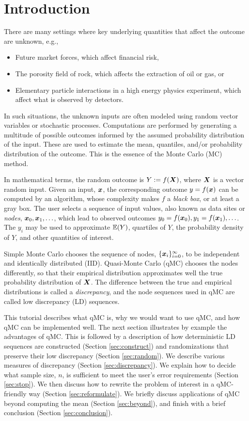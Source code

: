 \documentclass{svproc}
\newcounter{algorithm}%
\begin{document}
\section{Introduction} \label{sec:intro}
There are many settings where key underlying quantities that affect the outcome are unknown, e.g.,
\begin{itemize}
	\item Future market forces, which affect financial risk,
	\item The porosity field of rock, which affects the extraction of oil or gas, or
	\item Elementary particle interactions in a high energy physics experiment, which affect what is observed by detectors.
\end{itemize}
In such situations, the unknown inputs are often modeled using random vector variables or stochastic processes.  Computations are performed by generating a multitude of possible outcomes informed by the assumed probability distribution of the input. These are used to estimate the mean, quantiles, and/or probability distribution of the outcome.  This is the essence of the Monte Carlo (MC) method.

In mathematical terms, the random outcome is $Y := f({\boldsymbol{X}})$, where ${\boldsymbol{X}}$ is a vector random input.  Given an input, ${\boldsymbol{x}}$, the corresponding outcome  $y = f({\boldsymbol{x}})$ can be computed by an algorithm, whose complexity makes $f$ a \emph{black box}, or at least a gray box.  The user selects a sequence of input values, also known as data sites or \emph{nodes}, ${\boldsymbol{x}}_0, {\boldsymbol{x}}_1, \ldots$, which lead to observed outcomes $y_0 = f({\boldsymbol{x}}_0), y_1 = f({\boldsymbol{x}}_1), \ldots$.  The $y_i$ may be used to approximate ${\mathbb{E}}(Y)$, quartiles of $Y$, the probability density of $Y$, and other quantities of interest.

Simple  Monte Carlo chooses the sequence of nodes, $\{{\boldsymbol{x}}_i\}_{i=0}^\infty$, to be independent and identically distributed (IID).  Quasi-Monte Carlo (qMC)  chooses the nodes differently, so that their empirical distribution approximates well the true probability distribution of ${\boldsymbol{X}}$.  The difference between  the true and empirical distributions is called a \emph{discrepancy}, and the node sequences used in qMC are called low discrepancy (LD) sequences.

This tutorial describes what qMC is, why we would want to use qMC, and how qMC can be implemented well.  The next section illustrates by example the advantages of qMC.  This is followed by a description of how deterministic LD sequences are constructed (Section \ref{sec:construct}) and randomizations that preserve their low discrepancy (Section \ref{sec:random}).  We describe various measures of discrepancy (Section \ref{sec:discrepancy}).  We explain how to decide what sample size, $n$, is sufficient to meet the user's error requirements (Section \ref{sec:stop}).  We then discuss how to rewrite the problem of interest in a qMC-friendly way (Section \ref{sec:reformulate}). We briefly discuss applications of qMC beyond computing the mean (Section \ref{sec:beyond}), and finish with a brief conclusion (Section \ref{sec:conclusion}).
\end{document}
